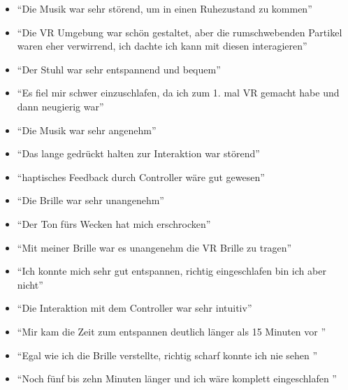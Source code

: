 \begin{itemize}
	\item "`Die Musik war sehr störend, um in einen Ruhezustand zu kommen"'
	\item "`Die VR Umgebung war schön gestaltet, aber die rumschwebenden Partikel waren eher verwirrend, ich dachte ich kann mit diesen interagieren"'
	\item "`Der Stuhl war sehr entspannend und bequem"'
	\item "`Es fiel mir schwer einzuschlafen, da ich zum 1. mal VR gemacht habe und dann neugierig war"'
	\item "`Die Musik war sehr angenehm"'
	\item "`Das lange gedrückt halten zur Interaktion war störend"'
	\item "`haptisches Feedback durch Controller wäre gut gewesen"'
	\item "`Die Brille war sehr unangenehm"'
	\item "`Der Ton fürs Wecken hat mich erschrocken"'
	\item "`Mit meiner Brille war es unangenehm die VR Brille zu tragen"'
	\item "`Ich konnte mich sehr gut entspannen, richtig eingeschlafen bin ich      aber nicht"'
	\item "`Die Interaktion mit dem Controller war sehr intuitiv"'
	\item "`Mir kam die Zeit zum entspannen deutlich länger als 15 Minuten vor "'
	\item "`Egal wie ich die Brille verstellte, richtig scharf konnte ich nie sehen "'
	\item "`Noch fünf bis zehn Minuten länger und ich wäre komplett eingeschlafen "'

\end{itemize}

